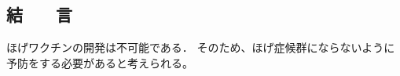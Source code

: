 \begin{small}
\section{結　　言}
ほげワクチンの開発は不可能である．
そのため、ほげ症候群にならないように予防をする必要があると考えられる。
 
 
 
 
 
 
 
{
\small
 \setlength{\kanjiskip}{0.0zw plus.01zw} %
 \setlength{\baselineskip}{9pt}        %
 \setlength{\itemsep}{0.2pt}             %
 \setlength{\lineskip}{0pt}              %


}
 
 
 
\end{small}
